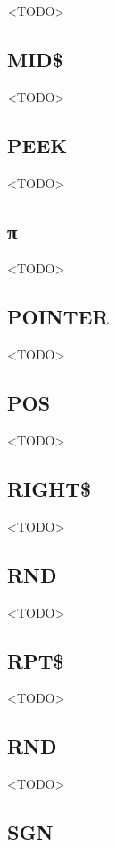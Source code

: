 <TODO>

\subsection{MID\$}

<TODO>

\subsection{PEEK}

<TODO>

\subsection{\ttfamily π}

<TODO>

\subsection{POINTER}

<TODO>

\subsection{POS}

<TODO>

\subsection{RIGHT\$}

<TODO>

\subsection{RND}

<TODO>

\subsection{RPT\$}

<TODO>

\subsection{RND}

<TODO>

\subsection{SGN}

